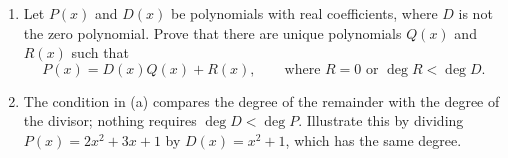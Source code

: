 \begin{enumerate}
\item[(a)] Let $P(x)$ and $D(x)$ be polynomials with real coefficients, where $D$ is not the zero polynomial. Prove that there are unique polynomials $Q(x)$ and $R(x)$ such that
\[P(x)=D(x)Q(x)+R(x),\qquad\text{where }R=0\text{ or }\deg R<\deg D.\]
\item[(b)] The condition in (a) compares the degree of the remainder with the degree of the divisor; nothing requires $\deg D<\deg P$. Illustrate this by dividing $P(x)=2x^2+3x+1$ by $D(x)=x^2+1$, which has the same degree.
\end{enumerate}
